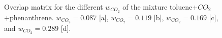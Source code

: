 \documentclass[
	12pt,				%
	openany,			%
	oneside,			%
	a4paper,			%
	english,			%
	brazil				%
	]{abntex2}
\begin{document}
\begin{apendicesenv}
\begin{figure}
	\caption{Overlap matrix for the different $w_{CO_2}$ of the mixture toluene+$CO_{2}$+phenanthrene. $w_{CO_2}=0.087$ [a], $w_{CO_2}=0.119$ [b], $w_{CO_2}=0.169$ [c], and $w_{CO_2}=0.289$ [d].}%
	\label{fig:over3}%
\end{figure}


\end{apendicesenv}
\end{document}
